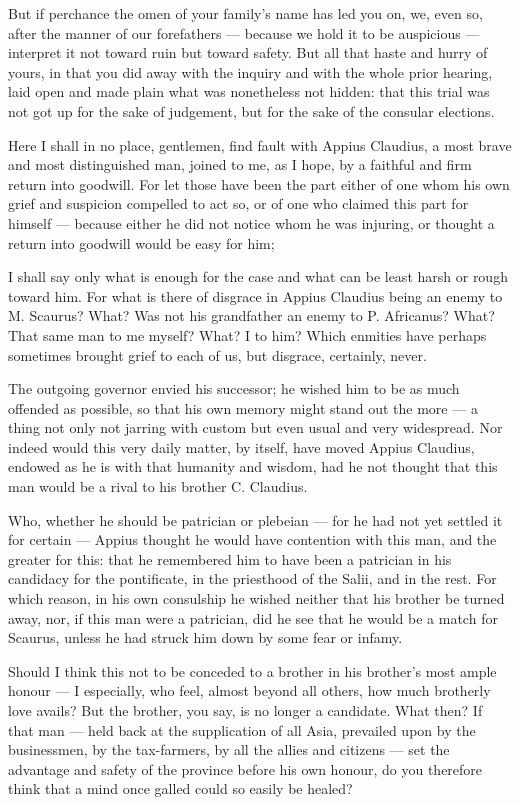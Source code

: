  But if perchance the omen of your family's name has led you on, we, even so, after the manner of our forefathers --- because we hold it to be auspicious --- interpret it not toward ruin but toward safety. But all that haste and hurry of yours, in that you did away with the inquiry and with the whole prior hearing, laid open and made plain what was nonetheless not hidden: that this trial was not got up for the sake of judgement, but for the sake of the consular elections.

 Here I shall in no place, gentlemen, find fault with Appius Claudius, a most brave and most distinguished man, joined to me, as I hope, by a faithful and firm return into goodwill. For let those have been the part either of one whom his own grief and suspicion compelled to act so, or of one who claimed this part for himself --- because either he did not notice whom he was injuring, or thought a return into goodwill would be easy for him;

 I shall say only what is enough for the case and what can be least harsh or rough toward him. For what is there of disgrace in Appius Claudius being an enemy to M. Scaurus? What? Was not his grandfather an enemy to P. Africanus? What? That same man to me myself? What? I to him? Which enmities have perhaps sometimes brought grief to each of us, but disgrace, certainly, never.

 The outgoing governor envied his successor; he wished him to be as much offended as possible, so that his own memory might stand out the more --- a thing not only not jarring with custom but even usual and very widespread. Nor indeed would this very daily matter, by itself, have moved Appius Claudius, endowed as he is with that humanity and wisdom, had he not thought that this man would be a rival to his brother C. Claudius.

 Who, whether he should be patrician or plebeian --- for he had not yet settled it for certain --- Appius thought he would have contention with this man, and the greater for this: that he remembered him to have been a patrician in his candidacy for the pontificate, in the priesthood of the Salii, and in the rest. For which reason, in his own consulship he wished neither that his brother be turned away, nor, if this man were a patrician, did he see that he would be a match for Scaurus, unless he had struck him down by some fear or infamy.

 Should I think this not to be conceded to a brother in his brother's most ample honour --- I especially, who feel, almost beyond all others, how much brotherly love avails? But the brother, you say, is no longer a candidate. What then? If that man --- held back at the supplication of all Asia, prevailed upon by the businessmen, by the tax-farmers, by all the allies and citizens --- set the advantage and safety of the province before his own honour, do you therefore think that a mind once galled could so easily be healed?

